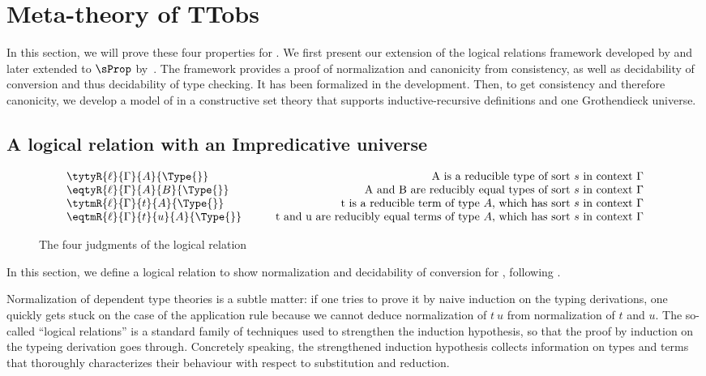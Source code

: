 \setchapterpreamble[u]{\margintoc}
\chapter{Meta-theory of TTobs}

In this section, we will prove these four properties for \SetoidCC.
%
We first present our extension of the
logical relations framework developed by  and
later extended to $\sProp$ by~. The
framework provides a proof of normalization and canonicity from
consistency, as well as decidability of conversion and thus decidability of
type checking.
%
It has been formalized in the \Agda development.
%
Then, to get consistency and therefore canonicity, we develop a model of
\SetoidCC in a constructive set theory that supports inductive-recursive definitions and one
Grothendieck universe.


\section{A logical relation with an Impredicative universe}
\label{sec:logic-relat-with}

\begin{figure*}
    \[
  \begin{array}{lr}
    \tytyR{\ell}{\Gamma}{A}{\Type{}} & \text{A is a reducible type of sort \( s \) in context \( \Gamma \)} \\
    \eqtyR{\ell}{\Gamma}{A}{B}{\Type{}} & \text{A and B are reducibly equal types of sort \( s \) in context \( \Gamma \)} \\
    \tytmR{\ell}{\Gamma}{t}{A}{\Type{}} & \text{t is a reducible term of type \( A \), which has sort \( s \) in context \( \Gamma \)} \\
    \eqtmR{\ell}{\Gamma}{t}{u}{A}{\Type{}} & \qquad\text{t and u are reducibly equal terms of type \( A \), which has sort \( s \) in context \( \Gamma \)}
  \end{array}
\]
  \caption{The four judgments of the logical relation}
  \label{fig:log-rel-judgments}
\end{figure*}

In this section, we define a logical relation to show
normalization and decidability of conversion for \SetoidCC, following
.

Normalization of dependent type theories is a subtle matter:
if one tries to prove it by naive induction on the typing derivations,
one quickly gets stuck on the case of the application rule because
we cannot deduce normalization of \( t~u \) from normalization of
$t$ and $u$.
%
The so-called ``logical relations'' is a standard family of techniques 
used to strengthen the induction hypothesis, so that the proof by induction 
on the typeing derivation goes through.
%
Concretely speaking, the strengthened induction hypothesis collects information 
on types and terms that thoroughly characterizes their behaviour with respect 
to substitution and reduction.

